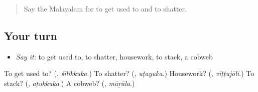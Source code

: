 \label{lesson:ML-R572-review-final-572}



\begin{quote}
Say the Malayalam for to get used to and to shatter.
\end{quote}

\subsection*{Your turn}
\begin{itemize}
\raggedright
  \item \emph{Say it:} to get used to, to shatter, housework, to stack, a cobweb
\end{itemize}

\begin{tcolorbox}[breakable,colback=teal!4,colframe=teal!35!black,title={Before you move on}]
To get used to? (\textbf{}, \emph{śīlikkuka}.) To shatter? (\textbf{}, \emph{uṭayuka}.) Housework? (\textbf{}, \emph{vīṭṭujōli}.) To stack? (\textbf{}, \emph{aṭukkuka}.) A cobweb? (\textbf{}, \emph{māṟāla}.)
\end{tcolorbox}
